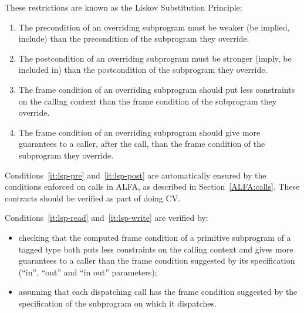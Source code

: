 \documentclass{article}
\begin{document}
These restrictions are known as the Liskov Substitution Principle:
\begin{enumerate}
\item \label{it:lsp-pre} The precondition of an overriding subprogram must be
  weaker (be implied, include) than the precondition of the subprogram they
  override.
\item \label{it:lsp-post} The postcondition of an overriding subprogram must be
  stronger (imply, be included in) than the postcondition of the subprogram
  they override.
\item \label{it:lsp-read} The frame condition of an overriding subprogram
  should put less constraints on the calling context than the frame condition
  of the subprogram they override.
\item \label{it:lsp-write} The frame condition of an overriding subprogram
  should give more guarantees to a caller, after the call, than the frame
  condition of the subprogram they override.
\end{enumerate}

Conditions~\ref{it:lsp-pre} and~\ref{it:lsp-post} are automatically ensured by
the conditions enforced on calls in ALFA, as described in
Section~\ref{ALFA:calls}. These contracts should be verified as part of doing
CV.

Conditions~\ref{it:lsp-read} and~\ref{it:lsp-write} are verified by:
\begin{itemize}
\item checking that the computed frame condition of a primitive subprogram of a
  tagged type both puts less constraints on the calling context and gives more
  guarantees to a caller than the frame condition suggested by its
  specification (``in'', ``out'' and ``in out'' parameters);
\item assuming that each dispatching call has the frame condition suggested by
  the specification of the subprogram on which it dispatches.
\end{itemize}
\end{document}
